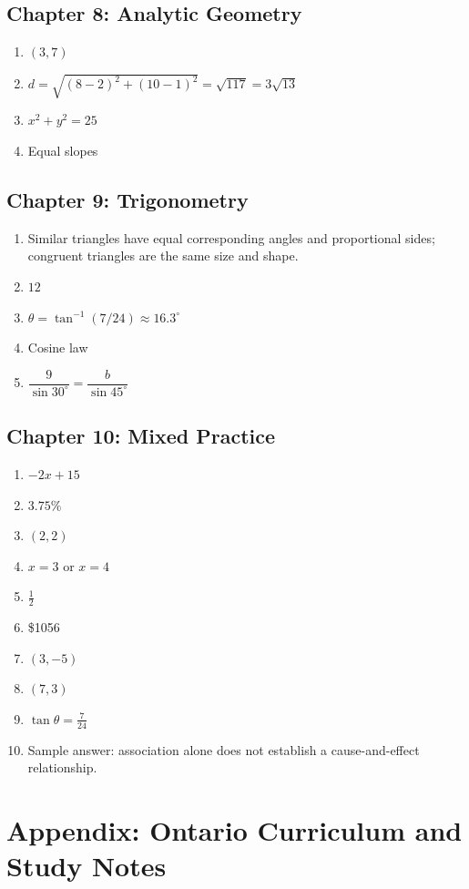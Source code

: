 \documentclass[11pt,oneside]{book}
\begin{document}
\section*{Chapter 8: Analytic Geometry}
\begin{enumerate}
  \item $(3,7)$
  \item $d=\sqrt{(8-2)^2+(10-1)^2}=\sqrt{117}=3\sqrt{13}$
  \item $x^2+y^2=25$
  \item Equal slopes
\end{enumerate}

\section*{Chapter 9: Trigonometry}
\begin{enumerate}
  \item Similar triangles have equal corresponding angles and proportional sides; congruent triangles are the same size and shape.
  \item $12$
  \item $\theta=\tan^{-1}(7/24)\approx 16.3^\circ$
  \item Cosine law
  \item $\dfrac{9}{\sin 30^\circ}=\dfrac{b}{\sin 45^\circ}$
\end{enumerate}

\section*{Chapter 10: Mixed Practice}
\begin{enumerate}
  \item $-2x+15$
  \item $3.75\%$
  \item $(2,2)$
  \item $x=3$ or $x=4$
  \item $\frac{1}{2}$
  \item \$1056
  \item $(3,-5)$
  \item $(7,3)$
  \item $\tan\theta=\frac{7}{24}$
  \item Sample answer: association alone does not establish a cause-and-effect relationship.
\end{enumerate}

\chapter{Appendix: Ontario Curriculum and Study Notes}
\end{document}
